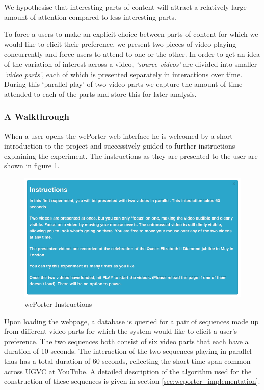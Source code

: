 We hypothesise that interesting parts of content will attract a relatively large amount of attention compared to less interesting parts. 

To force a users to make an explicit choice between parts of content for which we would like to elicit their preference, we present two pieces of video playing concurrently and force users to attend to one or the other. In order to get an idea of the variation of interest across a video, \emph{`source videos'} are divided into smaller \emph{`video parts'}, each of which is presented separately in interactions over time. During this `parallel play' of two video parts we capture the amount of time attended to each of the parts and store this for later analysis. 

\subsubsection{A Walkthrough}
When a user opens the wePorter web interface he is welcomed by a short introduction to the project and successively guided to further instructions explaining the experiment. The instructions as they are presented to the user are shown in figure \ref{fig:instructions}.

\begin{figure}[htbp]
  \centering
    \includegraphics[width=\textwidth]{img/instructions}
  \caption{wePorter Instructions}
  \label{fig:instructions}
\end{figure}

Upon loading the webpage, a database is queried for a pair of sequences made up from different video parts for which the system would like to elicit a user's preference. The two sequences both consist of six video parts that each have a duration of 10 seconds. The interaction of the two sequences playing in parallel thus has a total duration of 60 seconds, reflecting the short time span common across UGVC at YouTube\cite{Cha:2007ty, Cheng:2007tc}. A detailed description of the algorithm used for the construction of these sequences is given in section \ref{sec:weporter_implementation}.

